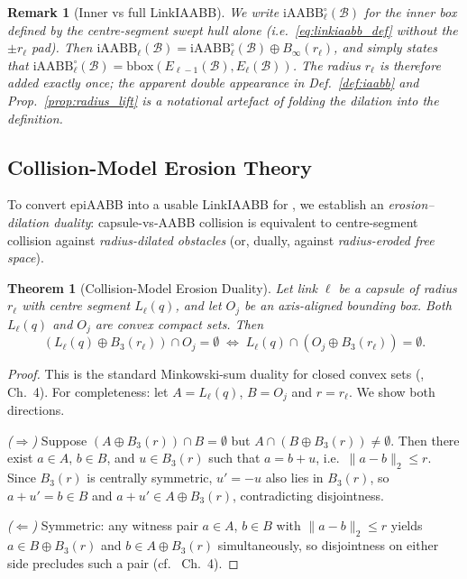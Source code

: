 \documentclass[journal]{IEEEtran}
\newtheorem{theorem}{Theorem}
\newtheorem{remark}{Remark}
\newcommand{\iAABB}{\mathrm{iAABB}}
\begin{document}
\begin{remark}[Inner vs full LinkIAABB]\label{rem:iaabb_inner}
We write $\iAABB_\ell^\circ(\mathcal{B})$ for the \emph{inner} box
defined by the centre-segment swept hull alone (i.e.\
\eqref{eq:linkiaabb_def} without the $\pm r_\ell$ pad). Then
$\iAABB_\ell(\mathcal{B}) = \iAABB_\ell^\circ(\mathcal{B})
\oplus B_\infty(r_\ell)$, and  simply states
that $\iAABB_\ell^\circ(\mathcal{B})
= \mathrm{bbox}(E_{\ell-1}(\mathcal{B}), E_\ell(\mathcal{B}))$. The
radius $r_\ell$ is therefore added \emph{exactly once}; the apparent
double appearance in Def.~\ref{def:iaabb} and Prop.~\ref{prop:radius_lift}
is a notational artefact of folding the dilation into the definition.
\end{remark}

\subsection{Collision-Model Erosion Theory}\label{sec:erosion}

To convert epiAABB into a usable LinkIAABB for , we
establish an \emph{erosion--dilation duality}: capsule-vs-AABB collision
is equivalent to centre-segment collision against \emph{radius-dilated
obstacles} (or, dually, against \emph{radius-eroded free space}).

\begin{theorem}[Collision-Model Erosion Duality]\label{thm:erosion}
Let link $\ell$ be a capsule of radius $r_\ell$ with centre segment
$L_\ell(q)$, and let $O_j$ be an axis-aligned bounding box.
Both $L_\ell(q)$ and $O_j$ are convex compact sets.
Then
\begin{equation}\label{eq:erosion}
(L_\ell(q)\oplus B_3(r_\ell))\cap O_j = \emptyset
\;\Longleftrightarrow\;
L_\ell(q)\cap (O_j\oplus B_3(r_\ell)) = \emptyset.
\end{equation}
\end{theorem}

\begin{proof}
This is the standard Minkowski-sum duality for closed convex sets
(\cite{ericson2004real}, Ch.~4). For completeness:
let $A=L_\ell(q)$, $B=O_j$ and $r=r_\ell$. We show both directions.

\emph{($\Rightarrow$)} Suppose $(A\oplus B_3(r))\cap B = \emptyset$
but $A\cap (B\oplus B_3(r)) \neq \emptyset$. Then there exist $a\in A$,
$b\in B$, and $u\in B_3(r)$ such that $a = b+u$, i.e.\ $\|a-b\|_2\le r$.
Since $B_3(r)$ is centrally symmetric, $u'=-u$ also lies in $B_3(r)$, so $a+u'=b\in B$
and $a+u'\in A\oplus B_3(r)$, contradicting disjointness.

\emph{($\Leftarrow$)} Symmetric: any witness pair $a\in A$, $b\in B$
with $\|a-b\|_2\le r$ yields $a\in B\oplus B_3(r)$ and
$b\in A\oplus B_3(r)$ simultaneously, so disjointness on either side
precludes such a pair (cf.\ \cite{ericson2004real} Ch.~4).
\end{proof}
\end{document}
